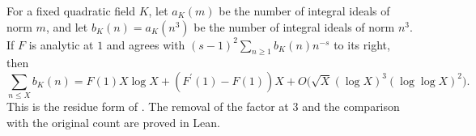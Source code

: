 \begin{citedtheorem}

\label{cite:kuehleitnerNowak2004-cor2}


\leanok

For a fixed quadratic field $K$, let $a_K(m)$ be the number of integral ideals of norm $m$, and let $b_K(n)=a_K(n^3)$ be the number of integral ideals of norm $n^3$. If $F$ is analytic at $1$ and agrees with $(s-1)^2\sum_{n\geq1}b_K(n)n^{-s}$ to its right, then \[\sum_{n\leq X}b_K(n)=F(1)X\log X+(F^\prime(1)-F(1))X+O\bigl(\sqrt X(\log X)^3(\log\log X)^2\bigr).\]This is the residue form of \cite[Corollary~2]{kuehleitnerNowak2004}. The removal of the factor at $3$ and the comparison with the original count are proved in Lean.

\end{citedtheorem}


